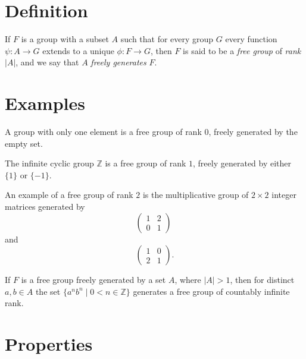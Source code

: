 \documentclass[12pt]{article}
\def\Z{\mathbb{Z}}
\begin{document}

\section*{Definition}

If $F$ is a group with a subset $A$ such that for every group $G$
every function $\psi\colon A\to G$ extends to a unique 
$\phi\colon F\to G$, then $F$ is said to be a \emph{free group} of \emph{rank} $|A|$,
and we say that $A$ \emph{freely generates} $F$.

\section*{Examples}

A group with only one element is a free group of rank $0$, freely generated by the empty set.

The infinite cyclic group $\Z$ is a free group of rank $1$, freely generated by either $\{1\}$ or $\{-1\}$.

An example of a free group of rank $2$ is the multiplicative group of $2\times2$ integer matrices generated by
\[ \left( \begin{array}{cc}
1 & 2 \\
0 & 1 \end{array} \right)\phantom{.}\] 
and
\[ \left( \begin{array}{cc}
1 & 0 \\
2 & 1 \end{array} \right).\] 

If $F$ is a free group freely generated by a set $A$, where $|A|>1$, then for distinct $a,b\in A$ the set $\{a^nb^n\mid 0<n\in\Z\}$ generates a free group of countably infinite rank.

\section*{Properties}
\end{document}
